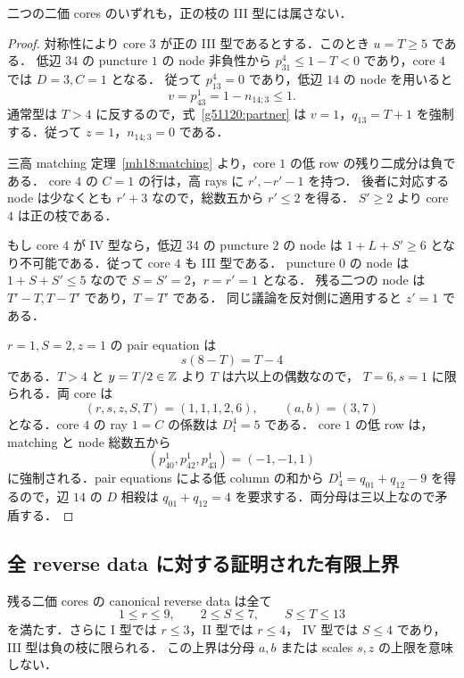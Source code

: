 \begin{lemma}\label{g51120:no-positive-III}
二つの二価 cores のいずれも，正の枝の III 型には属さない．
\end{lemma}
\begin{proof}
対称性により core $3$ が正の III 型であるとする．このとき $u=T\ge5$ である．
低辺 $34$ の puncture $1$ の node 非負性から
$p^4_{31}\le1-T<0$ であり，core $4$ では $D=3,C=1$ となる．
従って $p^4_{13}=0$ であり，低辺 $14$ の node を用いると
\[
 v=p^1_{43}=1-n_{14;3}\le1.
\]
通常型は $T>4$ に反するので，式~\eqref{g51120:partner} は
$v=1$，$q_{13}=T+1$ を強制する．従って $z=1$，$n_{14;3}=0$ である．

三高 matching 定理~\ref{mh18:matching} より，core $1$ の低 row の残り二成分は負である．
core $4$ の $C=1$ の行は，高 rays に $r',-r'-1$ を持つ．
後者に対応する node は少なくとも $r'+3$ なので，総数五から $r'\le2$ を得る．
$S'\ge2$ より core $4$ は正の枝である．

もし core $4$ が IV 型なら，低辺 $34$ の puncture $2$ の node は
$1+L+S'\ge6$ となり不可能である．従って core $4$ も III 型である．
puncture $0$ の node は $1+S+S'\le5$ なので $S=S'=2$，$r=r'=1$ となる．
残る二つの node は $T'-T,T-T'$ であり，$T=T'$ である．
同じ議論を反対側に適用すると $z'=1$ である．

$r=1,S=2,z=1$ の pair equation は
\[
 s(8-T)=T-4
\]
である．$T>4$ と $y=T/2\in\mathbb Z$ より $T$ は六以上の偶数なので，
$T=6,s=1$ に限られる．両 core は
\[
 (r,s,z,S,T)=(1,1,1,2,6),\qquad (a,b)=(3,7)
\]
となる．core $4$ の ray $1=C$ の係数は $D^4_1=5$ である．
core $1$ の低 row は，matching と node 総数五から
\[
 (p^1_{40},p^1_{42},p^1_{43})=(-1,-1,1)
\]
に強制される．pair equations による低 column の和から
$D^1_4=q_{01}+q_{12}-9$ を得るので，辺 $14$ の $D$ 相殺は
$q_{01}+q_{12}=4$ を要求する．両分母は三以上なので矛盾する．
\end{proof}

\subsection{全 reverse data に対する証明された有限上界}

\begin{proposition}\label{g51120:reverse-bounds}
残る二価 cores の canonical reverse data は全て
\begin{equation}\label{g51120:box}
 1\le r\le9,\qquad 2\le S\le7,\qquad S\le T\le13
\end{equation}
を満たす．さらに I 型では $r\le3$，II 型では $r\le4$，
IV 型では $S\le4$ であり，III 型は負の枝に限られる．
この上界は分母 $a,b$ または scales $s,z$ の上限を意味しない．
\end{proposition}

